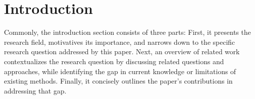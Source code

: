 
\chapter{Introduction}
\label{ch:introduction}

Commonly, the introduction section consists of three parts:
First, it presents the research field, motivatives its importance, and narrows down to the specific research question addressed by this paper.
Next, an overview of related work contextualizes the research question by discussing related questions and approaches, while identifying the gap in current knowledge or limitations of existing methods.
Finally, it concisely outlines the paper's contributions in addressing that gap.
















